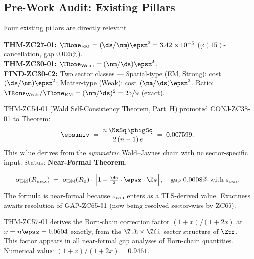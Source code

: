 \documentclass[12pt, a4paper]{article}
\renewcommand{\epscan}{\varepsilon_{\rm can}}
\renewcommand{\aEM}{\alpha_{\rm EM}}
\begin{document}
\subsection{Pre-Work Audit: Existing Pillars}
\label{sec:pwa}

Four existing pillars are directly relevant.

\begin{formalbox}[title={Pillar 1: Sector Crossing Costs (ZC27, ZC30)}]
\textbf{THM-ZC27-01:}
$\TRone_{\rm EM} = (\ds/\nm)\epsz^{2} = 3.42\times10^{-5}$
($\varphi(15)$-cancellation, gap $0.025\%$).\\
\textbf{THM-ZC30-01:}
$\TRone_{\rm Weak} = (\nm/\ds)\epsz^{2}$.\\
\textbf{FIND-ZC30-02:} Two sector classes ---
Spatial-type (EM, Strong): cost $(\ds/\nm)\epsz^{2}$;
Matter-type (Weak): cost $(\nm/\ds)\epsz^{2}$.
Ratio: $\TRone_{\rm Weak}/\TRone_{\rm EM} = (\nm/\ds)^{2} = 25/9$ (exact).
\end{formalbox}

\begin{formalbox}[title={Pillar 2: Universal Floor (THM-ZC54-01 via CONJ-ZC38-01)}]
THM-ZC54-01 (Wald Self-Consistency Theorem, Part~H) promoted
CONJ-ZC38-01 to Theorem:
\[
  \epsuniv \;=\; \frac{n\,\KsSq\,\phigSq}{2\,(n-1)\,e}
  \;=\; 0.007599.
\]
This value derives from the \emph{symmetric} Wald--Jaynes chain
with no sector-specific input.
Status: \textbf{Near-Formal Theorem}.
\end{formalbox}

\begin{formalbox}[title={Pillar 3: R-Layer Bridge (ZC65/THM-ZC65-01)}]
\[
  \aEM(R_{\max}) \;=\; \aEM(R_0)\cdot
  \Bigl[1 + \tfrac{\ds}{2}\cdot\epsz\cdot\Ks\Bigr],
  \quad\text{gap }0.0008\%\text{ with }\epscan.
\]
The formula is near-formal because $\epscan$ enters as a
TLS-derived value. Exactness awaits resolution of GAP-ZC65-01
(now being resolved sector-wise by ZC66).
\end{formalbox}

\begin{formalbox}[title={Pillar 4: Finite-$x$ Correction (ZC57/THM-ZC57-01)}]
THM-ZC57-01 derives the Born-chain correction factor
$(1+x)/(1+2x)$ at $x = n\epsz = 0.0604$ exactly,
from the $\Zth \times \Zfi$ sector structure of $\Ztf$.
This factor appears in all near-formal gap analyses
of Born-chain quantities.
Numerical value: $(1+x)/(1+2x) = 0.9461$.
\end{formalbox}
\end{document}
